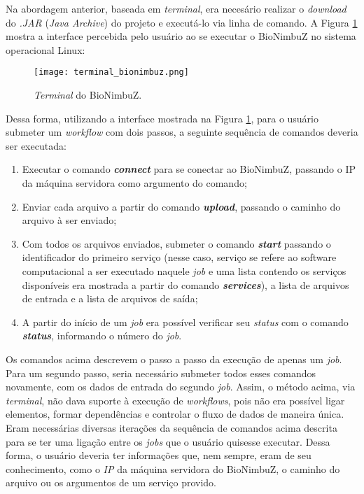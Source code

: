 Na abordagem anterior, baseada em \textit{terminal}, era necesário realizar o \textit{download} do \textit{.JAR} (\textit{Java Archive}) do projeto e executá-lo via linha de comando. A Figura \ref{fig:terminal_bionimbuz} mostra a interface percebida pelo usuário ao se executar o BioNimbuZ no sistema operacional Linux:

\begin{figure}[H]
	\centering
	\texttt{[image: terminal\_bionimbuz.png]}
	\caption{\textit{Terminal} do BioNimbuZ.}
	\label{fig:terminal_bionimbuz}
\end{figure}

Dessa forma, utilizando a interface mostrada na Figura \ref{fig:terminal_bionimbuz}, para o usuário submeter um \textit{workflow} com dois passos, a seguinte sequência de comandos deveria ser executada:

\begin{enumerate}
	\item [1.] Executar o comando \textbf{\textit{connect}} para se conectar ao BioNimbuZ, passando o IP da máquina servidora como argumento do comando;
    \item [2.] Enviar cada arquivo a partir do comando \textbf{\textit{upload}}, passando o caminho do arquivo à ser enviado;
    \item [3.] Com todos os arquivos enviados, submeter o comando \textbf{\textit{start}} passando o identificador do primeiro serviço (nesse caso, serviço se refere ao software computacional a ser executado naquele \textit{job} e uma lista contendo os serviços disponíveis era mostrada a partir do comando \textbf{\textit{services}}), a lista de arquivos de entrada e a lista de arquivos de saída;
    \item [4.] A partir do início de um \textit{job} era possível verificar seu \textit{status} com o comando \textbf{\textit{status}}, informando o número do \textit{job}.
\end{enumerate}

Os comandos acima descrevem o passo a passo da execução de apenas um \textit{job}. Para um segundo passo, seria necessário submeter todos esses comandos novamente, com os dados de entrada do segundo \textit{job}. Assim, o método acima, via \textit{terminal}, não dava suporte à execução de \textit{workflows}, pois não era possível ligar elementos, formar dependências e controlar o fluxo de dados de maneira única. Eram necessárias diversas iterações da sequência de comandos acima descrita para se ter uma ligação entre os \textit{jobs} que o usuário quisesse executar. Dessa forma, o usuário deveria ter informações que, nem sempre, eram de seu conhecimento, como o \textit{IP} da máquina servidora do BioNimbuZ, o caminho do arquivo ou os argumentos de um serviço provido. 

